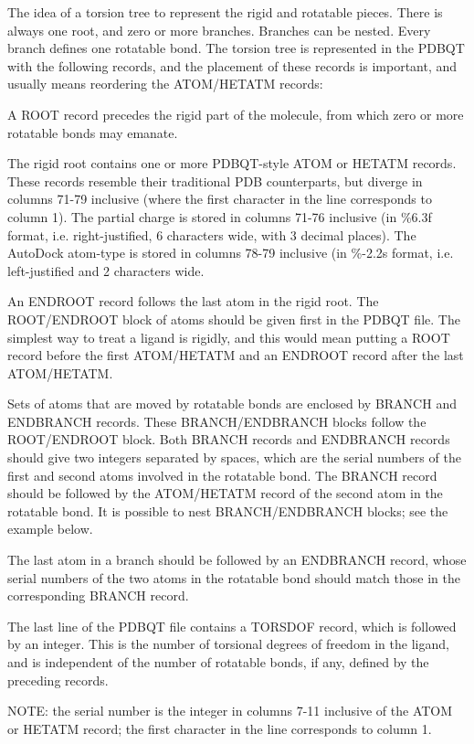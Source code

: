 \documentclass[twocolumn]{svjour3}          %
\begin{document}
The idea of a torsion tree to represent the rigid and rotatable pieces. There is always one root, and zero or more branches. Branches can be nested. Every branch defines one rotatable bond. The torsion tree is represented in the PDBQT with the following records, and the placement of these records is important, and usually means reordering the ATOM/HETATM records: %

A ROOT record precedes the rigid part of the molecule, from which zero or more rotatable bonds may emanate.

The rigid root contains one or more PDBQT-style ATOM or HETATM records. These records resemble their traditional PDB counterparts, but diverge in columns 71-79 inclusive (where the first character in the line corresponds to column 1). The partial charge is stored in columns 71-76 inclusive (in \%6.3f format, i.e. right-justified, 6 characters wide, with 3 decimal places). The AutoDock atom-type is stored in columns 78-79 inclusive (in \%-2.2s format, i.e. left-justified and 2 characters wide.

An ENDROOT record follows the last atom in the rigid root. The ROOT/ENDROOT block of atoms should be given first in the PDBQT file. The simplest way to treat a ligand is rigidly, and this would mean putting a ROOT record before the first ATOM/HETATM and an ENDROOT record after the last ATOM/HETATM.

Sets of atoms that are moved by rotatable bonds are enclosed by BRANCH and ENDBRANCH records. These BRANCH/ENDBRANCH blocks follow the ROOT/ENDROOT block. Both BRANCH records and ENDBRANCH records should give two integers separated by spaces, which are the serial numbers of the first and second atoms involved in the rotatable bond. The BRANCH record should be followed by the ATOM/HETATM record of the second atom in the rotatable bond. It is possible to nest BRANCH/ENDBRANCH blocks; see the example below.

The last atom in a branch should be followed by an ENDBRANCH record, whose serial numbers of the two atoms in the rotatable bond should match those in the corresponding BRANCH record.

The last line of the PDBQT file contains a TORSDOF record, which is followed by an integer. This is the number of torsional degrees of freedom in the ligand, and is independent of the number of rotatable bonds, if any, defined by the preceding records.

NOTE: the serial number is the integer in columns 7-11 inclusive of the ATOM or HETATM record; the first character in the line corresponds to column 1.
\end{document}
